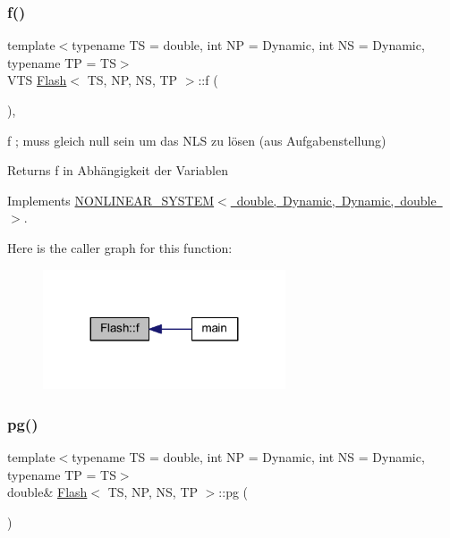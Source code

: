 \subsubsection{\texorpdfstring{f()}{f()}}
{\footnotesize\ttfamily template$<$typename TS = double, int NP = Dynamic, int NS = Dynamic, typename TP = TS$>$ \\
V\+TS \mbox{\hyperlink{class_flash}{Flash}}$<$ TS, NP, NS, TP $>$\+::f (\begin{DoxyParamCaption}{ }\end{DoxyParamCaption})\hspace{0.3cm}{\ttfamily [inline]}, {\ttfamily [virtual]}}



f ; muss gleich null sein um das N\+LS zu lösen (aus Aufgabenstellung) 

\begin{DoxyReturn}{Returns}
f in Abhängigkeit der Variablen 
\end{DoxyReturn}


Implements \mbox{\hyperlink{class_n_o_n_l_i_n_e_a_r___s_y_s_t_e_m_a65827d7df297f26cd3f14f472a212077}{N\+O\+N\+L\+I\+N\+E\+A\+R\+\_\+\+S\+Y\+S\+T\+E\+M$<$ double, Dynamic, Dynamic, double $>$}}.

Here is the caller graph for this function\+:\nopagebreak
\begin{figure}[H]
\begin{center}
\leavevmode
\includegraphics[width=203pt]{class_flash_ad29e755877ca96aa5b9f34a10d6cd8b2_icgraph}
\end{center}
\end{figure}
\mbox{\label{class_flash_ac3cec3cdb03bd71e7b32d7e77a209308}} 
\subsubsection{\texorpdfstring{pg()}{pg()}}
{\footnotesize\ttfamily template$<$typename TS = double, int NP = Dynamic, int NS = Dynamic, typename TP = TS$>$ \\
double\& \mbox{\hyperlink{class_flash}{Flash}}$<$ TS, NP, NS, TP $>$\+::pg (\begin{DoxyParamCaption}{ }\end{DoxyParamCaption})\hspace{0.3cm}{\ttfamily [inline]}}



